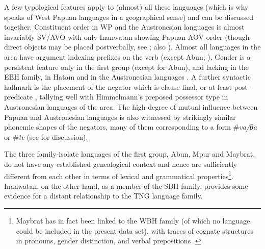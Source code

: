A few typological features apply to (almost) all these languages (which is why \citealt{reesink2005west} speaks of West Papuan languages in a geographical sense) and can be discussed together. Constituent order in WP  and the Austronesian languages is almost invariably SV/AVO with only Inanwatan showing Papuan AOV order (though direct objects may be placed postverbally, see \citealt[195]{reesink2005west}; also \citealt[52f.]{devries2004}). Almost all languages in the area have argument indexing prefixes on the verb (except Abun; \citealt[5]{dol2007grammar}). Gender is a persistent feature only in the first group (except for Abun), and lacking in the \textsc{EBH} family, in Hatam and in the Austronesian languages \citep[205]{reesink2005west}. A further syntactic hallmark is the placement of the negator which is clause-final, or at least post-predicate \citep[199]{reesink2005west}, tallying well with Himmelmann's  preposed possessor type in Austronesian languages of the area. The high degree of mutual influence between Papuan and Austronesian languages is also witnessed by strikingly similar phonemic shapes of the negators, many of them corresponding to a form \#\textit{va/βa} or \#\textit{te} (see  \citealt[199]{reesink2005west} for discussion).

The three family-isolate languages of the first group, Abun, Mpur and Maybrat, do not have any established genealogical context and hence are sufficiently different from each other in terms of lexical and grammatical properties\footnote{Maybrat has in fact been linked to the \textsc{WBH} family (of which no language could be included in the present data set), with traces of cognate structures in pronouns, gender distinction, and verbal prepositions \citep[187]{reesink2005west}.}. Inanwatan, on the other hand, as a member of the SBH family, provides some evidence for a distant relationship to the TNG language family. 

